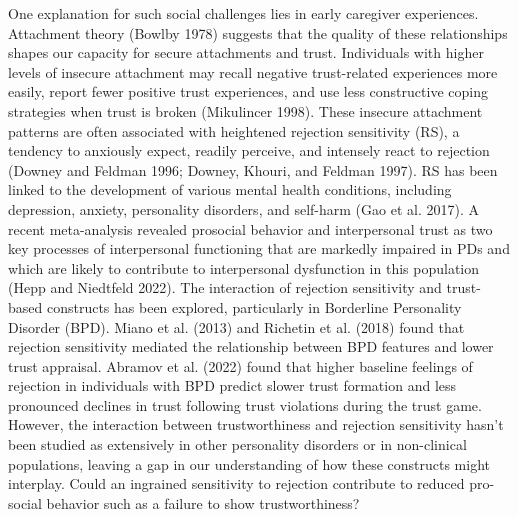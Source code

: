 \documentclass[
]{article}
\begin{document}
One explanation for such social challenges lies in early caregiver experiences. Attachment theory (Bowlby 1978) suggests that the quality of these relationships shapes our capacity for secure attachments and trust. Individuals with higher levels of insecure attachment may recall negative trust-related experiences more easily, report fewer positive trust experiences, and use less constructive coping strategies when trust is broken (Mikulincer 1998). These insecure attachment patterns are often associated with heightened rejection sensitivity (RS), a tendency to anxiously expect, readily perceive, and intensely react to rejection (Downey and Feldman 1996; Downey, Khouri, and Feldman 1997). RS has been linked to the development of various mental health conditions, including depression, anxiety, personality disorders, and self-harm (Gao et al. 2017). A recent meta-analysis revealed prosocial behavior and interpersonal trust as two key processes of interpersonal functioning that are markedly impaired in PDs and which are likely to contribute to interpersonal dysfunction in this population (Hepp and Niedtfeld 2022). The interaction of rejection sensitivity and trust-based constructs has been explored, particularly in Borderline Personality Disorder (BPD). Miano et al. (2013) and Richetin et al. (2018) found that rejection sensitivity mediated the relationship between BPD features and lower trust appraisal. Abramov et al. (2022) found that higher baseline feelings of rejection in individuals with BPD predict slower trust formation and less pronounced declines in trust following trust violations during the trust game. However, the interaction between trustworthiness and rejection sensitivity hasn't been studied as extensively in other personality disorders or in non-clinical populations, leaving a gap in our understanding of how these constructs might interplay. Could an ingrained sensitivity to rejection contribute to reduced pro-social behavior such as a failure to show trustworthiness?
\end{document}
